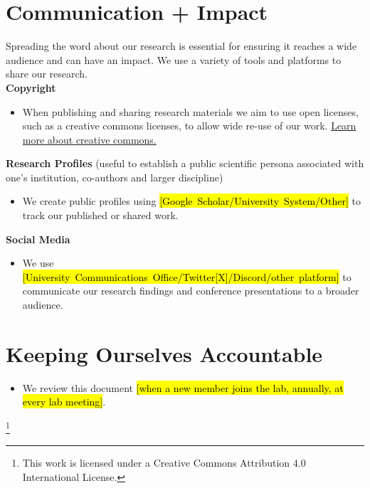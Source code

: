 \documentclass{article}
\begin{document}
\section*{\textcolor{myGreen}{Communication + Impact}}
Spreading the word about our research is essential for ensuring it reaches a wide audience and can have an impact. We use a variety of tools and platforms to share our research.\\

\textbf{Copyright}
\begin{itemize}
    \item When publishing and sharing research materials we aim to use open licenses, such as a creative commons licenses, to allow wide re-use of our work. \href{https://creativecommons.org/choose/}{Learn more about creative commons.}
\end{itemize}
\textbf{Research Profiles} (useful to establish a public scientific persona associated with one’s institution, co-authors and larger discipline)
\begin{itemize}
    \item We create public profiles using \hl{\hbox{[Google Scholar/University System/Other]}} to track our published or shared work.
\end{itemize}

\textbf{Social Media}
\begin{itemize}
\item We use \hl{\hbox{[University Communications Office/Twitter[X]/Discord/other platform]}} to communicate our research findings and conference presentations to a broader audience.
\end{itemize}

\section*{Keeping Ourselves Accountable}
\begin{itemize}
    \item We review this document \hl{[when a new member joins the lab, annually, at every lab meeting]}.
\end{itemize}

{\let\thefootnote\relax\footnote{{This work is licensed under a Creative Commons Attribution 4.0 International License.}}}
\end{document}
